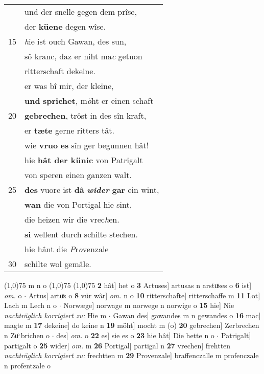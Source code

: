 \documentclass[8pt,a4paper,notitlepage]{article}
\begin{document}
\begin{table}[ht]
\begin{minipage}[t]{0.5\linewidth}
\begin{tabular}{rl}
 & und der snelle gegen dem prîse,\\ 
 & der \textbf{küene} degen wîse.\\ 
15 & \textit{h}ie ist ouch Gawan, des sun,\\ 
 & sô kranc, daz er niht ma\textit{c} getuon\\ 
 & ritterschaft dekeine.\\ 
 & er was bî mir, der kleine,\\ 
 & \textbf{und} \textbf{sprichet}, m\textit{ö}ht er einen schaft\\ 
20 & \textbf{gebrechen}, trôst in des sîn kraft,\\ 
 & er \textbf{tæte} gerne ritters tât.\\ 
 & wie \textbf{vruo} \textbf{es} sîn ger begunnen hât!\\ 
 & hie \textbf{hât der künic} von Patrigalt\\ 
 & von speren einen ganzen walt.\\ 
25 & \textbf{des} vuore ist \textbf{dâ} \textit{\textbf{wider}} \textbf{gar} ein wint,\\ 
 & \textbf{wan} die von Portigal hie sint,\\ 
 & die heizen wir die vrec\textit{h}en.\\ 
 & \textbf{si} wellent durch schilte stechen.\\ 
 & hie hânt die \textit{P}r\textit{o}venzale\\ 
30 & schilte wol gemâle.\\ 
\end{tabular}
\scriptsize
\line(1,0){75} \newline
m n o \newline
\line(1,0){75} \newline
\newline
\line(1,0){75} \newline
\textbf{2} hât] het o \textbf{3} Artuses] artusas n arstuͯses o \textbf{6} ist] \textit{om.} o  $\cdot$ Artus] artuͯs o \textbf{8} vür wâr] \textit{om.} n o \textbf{10} ritterschafte] ritterschaffe m \textbf{11} Lot] Lach m Lech n o  $\cdot$ Norwæge] norwage m norwege n norwige o \textbf{15} hie] Nie \textit{nachträglich korrigiert zu:} Hie m  $\cdot$ Gawan des] gawandes m n gewandes o \textbf{16} mac] magte m \textbf{17} dekeine] do keine n \textbf{19} möht] mocht m (o) \textbf{20} gebrechen] Zerbrechen n Zuͦ brichen o  $\cdot$ des] \textit{om.} o \textbf{22} es] sie es o \textbf{23} hie hât] Die hette n o  $\cdot$ Patrigalt] partigalt o \textbf{25} wider] \textit{om.} m \textbf{26} Portigal] partigal n \textbf{27} vrechen] frehtten \textit{nachträglich korrigiert zu:} frechtten m \textbf{29} Provenzale] braffenczalle m profenczale n profentzale o \newline
\end{minipage}
\end{table}
\end{document}
